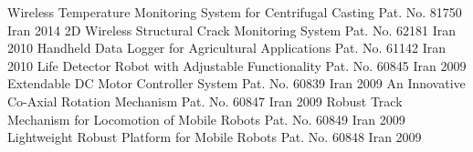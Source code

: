 \begin{cvhonors}
  \cvhonor
    {Wireless Temperature Monitoring System for Centrifugal Casting}
    {Pat. No. 81750}
    {Iran}
    {2014}
  \cvhonor
    {2D Wireless Structural Crack Monitoring System}
    {Pat. No. 62181}
    {Iran}
    {2010}
  \cvhonor
    {Handheld Data Logger for Agricultural Applications}
    {Pat. No. 61142}
    {Iran}
    {2010}
  \cvhonor
    {Life Detector Robot with Adjustable Functionality}
    {Pat. No. 60845}
    {Iran}
    {2009}
  \cvhonor
    {Extendable DC Motor Controller System}
    {Pat. No. 60839}
    {Iran}
    {2009}
  \cvhonor
    {An Innovative Co-Axial Rotation Mechanism}
    {Pat. No. 60847}
    {Iran}
    {2009}
  \cvhonor
    {Robust Track Mechanism for Locomotion of Mobile Robots}
    {Pat. No. 60849}
    {Iran}
    {2009}
  \cvhonor
    {Lightweight Robust Platform for Mobile Robots}
    {Pat. No. 60848}
    {Iran}
    {2009}
\end{cvhonors}
